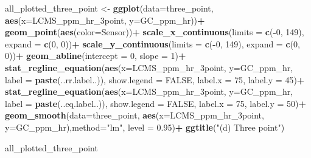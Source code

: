 \documentclass[
]{article}
\newenvironment{Shaded}{\begin{snugshade}}{\end{snugshade}}
\newcommand{\AttributeTok}[1]{\textcolor[rgb]{0.13,0.29,0.53}{#1}}
\newcommand{\ConstantTok}[1]{\textcolor[rgb]{0.56,0.35,0.01}{#1}}
\newcommand{\DecValTok}[1]{\textcolor[rgb]{0.00,0.00,0.81}{#1}}
\newcommand{\FloatTok}[1]{\textcolor[rgb]{0.00,0.00,0.81}{#1}}
\newcommand{\FunctionTok}[1]{\textcolor[rgb]{0.13,0.29,0.53}{\textbf{#1}}}
\newcommand{\NormalTok}[1]{#1}
\newcommand{\OtherTok}[1]{\textcolor[rgb]{0.56,0.35,0.01}{#1}}
\newcommand{\SpecialCharTok}[1]{\textcolor[rgb]{0.81,0.36,0.00}{\textbf{#1}}}
\newcommand{\StringTok}[1]{\textcolor[rgb]{0.31,0.60,0.02}{#1}}
\begin{document}
\begin{Shaded}
\begin{Highlighting}[]
\NormalTok{all\_plotted\_three\_point }\OtherTok{\textless{}{-}}
\FunctionTok{ggplot}\NormalTok{(}\AttributeTok{data=}\NormalTok{three\_point, }\FunctionTok{aes}\NormalTok{(}\AttributeTok{x=}\NormalTok{LCMS\_ppm\_hr\_3point, }\AttributeTok{y=}\NormalTok{GC\_ppm\_hr))}\SpecialCharTok{+}
  \FunctionTok{geom\_point}\NormalTok{(}\FunctionTok{aes}\NormalTok{(}\AttributeTok{color=}\NormalTok{Sensor))}\SpecialCharTok{+}
  \FunctionTok{scale\_x\_continuous}\NormalTok{(}\AttributeTok{limits =} \FunctionTok{c}\NormalTok{(}\SpecialCharTok{{-}}\DecValTok{0}\NormalTok{, }\DecValTok{149}\NormalTok{), }\AttributeTok{expand =} \FunctionTok{c}\NormalTok{(}\DecValTok{0}\NormalTok{, }\DecValTok{0}\NormalTok{))}\SpecialCharTok{+}
  \FunctionTok{scale\_y\_continuous}\NormalTok{(}\AttributeTok{limits =} \FunctionTok{c}\NormalTok{(}\SpecialCharTok{{-}}\DecValTok{0}\NormalTok{, }\DecValTok{149}\NormalTok{), }\AttributeTok{expand =} \FunctionTok{c}\NormalTok{(}\DecValTok{0}\NormalTok{, }\DecValTok{0}\NormalTok{))}\SpecialCharTok{+}
  \FunctionTok{geom\_abline}\NormalTok{(}\AttributeTok{intercept =} \DecValTok{0}\NormalTok{, }\AttributeTok{slope =} \DecValTok{1}\NormalTok{)}\SpecialCharTok{+}
  \FunctionTok{stat\_regline\_equation}\NormalTok{(}\FunctionTok{aes}\NormalTok{(}\AttributeTok{x=}\NormalTok{LCMS\_ppm\_hr\_3point, }\AttributeTok{y=}\NormalTok{GC\_ppm\_hr, }
    \AttributeTok{label =}  \FunctionTok{paste}\NormalTok{(..rr.label..)),}
    \AttributeTok{show.legend =} \ConstantTok{FALSE}\NormalTok{, }
    \AttributeTok{label.x =} \DecValTok{75}\NormalTok{,}
    \AttributeTok{label.y =} \DecValTok{45}\NormalTok{)}\SpecialCharTok{+}
  \FunctionTok{stat\_regline\_equation}\NormalTok{(}\FunctionTok{aes}\NormalTok{(}\AttributeTok{x=}\NormalTok{LCMS\_ppm\_hr\_3point, }\AttributeTok{y=}\NormalTok{GC\_ppm\_hr, }
    \AttributeTok{label =} \FunctionTok{paste}\NormalTok{(..eq.label..)),}
    \AttributeTok{show.legend =} \ConstantTok{FALSE}\NormalTok{, }
    \AttributeTok{label.x =} \DecValTok{75}\NormalTok{, }
    \AttributeTok{label.y =} \DecValTok{50}\NormalTok{)}\SpecialCharTok{+}
  \FunctionTok{geom\_smooth}\NormalTok{(}\AttributeTok{data=}\NormalTok{three\_point, }\FunctionTok{aes}\NormalTok{(}\AttributeTok{x=}\NormalTok{LCMS\_ppm\_hr\_3point, }\AttributeTok{y=}\NormalTok{GC\_ppm\_hr),}\AttributeTok{method=}\StringTok{"lm"}\NormalTok{, }\AttributeTok{level =} \FloatTok{0.95}\NormalTok{)}\SpecialCharTok{+}
  \FunctionTok{ggtitle}\NormalTok{(}\StringTok{"(d) Three point"}\NormalTok{)}
  

\NormalTok{all\_plotted\_three\_point}
\end{Highlighting}
\end{Shaded}
\end{document}
